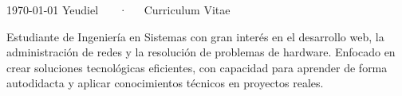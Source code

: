 \documentclass[11pt, a4paper]{awesome-cv}
\begin{document}
\makecvheader

\makecvfooter
  {\today}
  {Yeudiel ~~~·~~~Curriculum Vitae}
  {\thepage}

\begin{cvparagraph}
Estudiante de Ingeniería en Sistemas con gran interés en el desarrollo web, la administración de redes y la resolución de problemas de hardware. Enfocado en crear soluciones tecnológicas eficientes, con capacidad para aprender de forma autodidacta y aplicar conocimientos técnicos en proyectos reales.
\end{cvparagraph}




\end{document}
